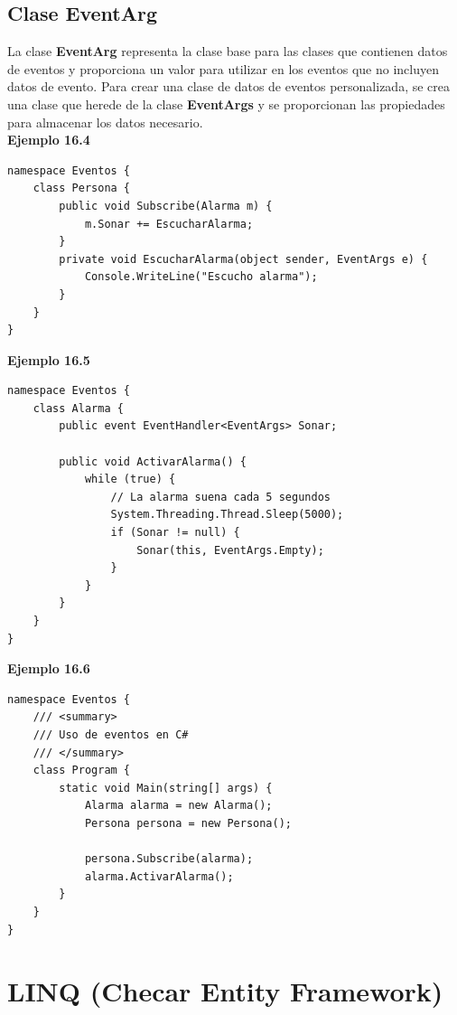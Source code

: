 \documentclass[12pt,a4paper]{report}
\begin{document}
\section{Clase EventArg}
La clase \textbf{EventArg} representa la clase base para las clases que contienen datos de eventos y proporciona un valor para utilizar en los eventos que no incluyen datos de evento. Para crear una clase de datos de eventos personalizada, se crea una clase que herede de la clase\textbf{ EventArgs} y se proporcionan las propiedades para almacenar los datos necesario.\\\textbf{Ejemplo 16.4}
\begin{lstlisting}
namespace Eventos {
    class Persona {
        public void Subscribe(Alarma m) {
            m.Sonar += EscucharAlarma;
        }
        private void EscucharAlarma(object sender, EventArgs e) {
            Console.WriteLine("Escucho alarma");
        }
    }
}
\end{lstlisting}\textbf{Ejemplo 16.5}
\begin{lstlisting}
namespace Eventos {
    class Alarma {
        public event EventHandler<EventArgs> Sonar;

        public void ActivarAlarma() {
            while (true) {
                // La alarma suena cada 5 segundos
                System.Threading.Thread.Sleep(5000);
                if (Sonar != null) {
                    Sonar(this, EventArgs.Empty);
                }
            }
        }
    }
}
\end{lstlisting}\textbf{Ejemplo 16.6}
\begin{lstlisting}
namespace Eventos {
    /// <summary>
    /// Uso de eventos en C#
    /// </summary>
    class Program {
        static void Main(string[] args) {
            Alarma alarma = new Alarma();
            Persona persona = new Persona();

            persona.Subscribe(alarma);
            alarma.ActivarAlarma();
        }
    }
}
\end{lstlisting}

\chapter{LINQ (Checar Entity Framework)}
\end{document}
